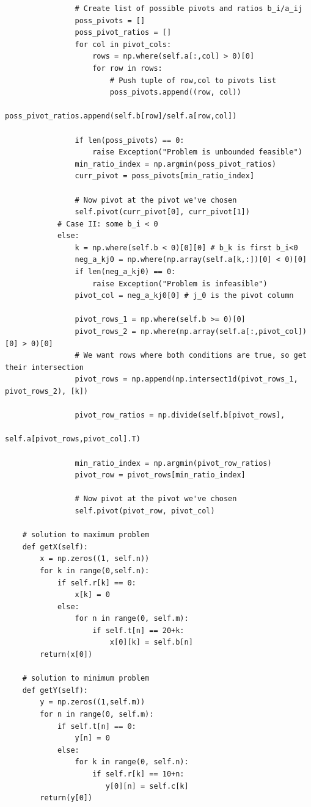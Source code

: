 \begin{scriptsize}
\begin{verbatim}
                # Create list of possible pivots and ratios b_i/a_ij
                poss_pivots = []
                poss_pivot_ratios = []
                for col in pivot_cols:
                    rows = np.where(self.a[:,col] > 0)[0]
                    for row in rows:
                        # Push tuple of row,col to pivots list
                        poss_pivots.append((row, col))
                        poss_pivot_ratios.append(self.b[row]/self.a[row,col])
                
                if len(poss_pivots) == 0:
                    raise Exception("Problem is unbounded feasible")
                min_ratio_index = np.argmin(poss_pivot_ratios)
                curr_pivot = poss_pivots[min_ratio_index]

                # Now pivot at the pivot we've chosen
                self.pivot(curr_pivot[0], curr_pivot[1])
            # Case II: some b_i < 0
            else:
                k = np.where(self.b < 0)[0][0] # b_k is first b_i<0
                neg_a_kj0 = np.where(np.array(self.a[k,:])[0] < 0)[0]
                if len(neg_a_kj0) == 0:
                    raise Exception("Problem is infeasible")
                pivot_col = neg_a_kj0[0] # j_0 is the pivot column
                
                pivot_rows_1 = np.where(self.b >= 0)[0]
                pivot_rows_2 = np.where(np.array(self.a[:,pivot_col])[0] > 0)[0]
                # We want rows where both conditions are true, so get their intersection
                pivot_rows = np.append(np.intersect1d(pivot_rows_1, pivot_rows_2), [k])

                pivot_row_ratios = np.divide(self.b[pivot_rows],
                                                    self.a[pivot_rows,pivot_col].T)
                
                min_ratio_index = np.argmin(pivot_row_ratios)
                pivot_row = pivot_rows[min_ratio_index]

                # Now pivot at the pivot we've chosen
                self.pivot(pivot_row, pivot_col)
        
    # solution to maximum problem
    def getX(self):
        x = np.zeros((1, self.n))
        for k in range(0,self.n):
            if self.r[k] == 0:
                x[k] = 0
            else:
                for n in range(0, self.m):
                    if self.t[n] == 20+k:
                        x[0][k] = self.b[n]
        return(x[0])
    
    # solution to minimum problem
    def getY(self):
        y = np.zeros((1,self.m))
        for n in range(0, self.m):
            if self.t[n] == 0:
                y[n] = 0
            else:
                for k in range(0, self.n):
                    if self.r[k] == 10+n:
                       y[0][n] = self.c[k]
        return(y[0])
\end{verbatim}
\end{scriptsize}

